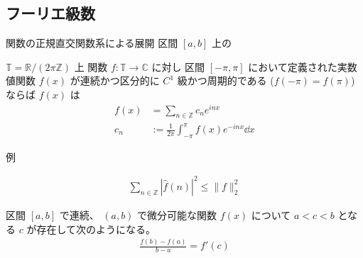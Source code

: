 \documentclass[uplatex,dvipdfmx,a4paper,11pt]{jlreq}
\newcommand{\CC}{\mathbb{C}}
\newcommand{\RR}{\mathbb{R}}
\newcommand{\ZZ}{\mathbb{Z}}
\newcommand{\TT}{\mathbb{T}}
\theoremstyle{definition}
\begin{document}
\subsection{フーリエ級数}
\begin{definition}[内積]
  関数の正規直交関数系による展開
  区間 $[a, b]$ 上の
\end{definition}


\begin{definition}[複素フーリエ級数]
  $\TT = \RR/(2\pi\ZZ)$ 上 関数 $f: \TT\to\CC$ に対し
  区間 $[-\pi, \pi]$ において定義された実数値関数 $f(x)$ が連続かつ区分的に $C^1$ 級かつ周期的である ($f(-\pi) = f(\pi)$) ならば $f(x)$ は
  \begin{align}
    f(x) & = \sum_{n\in\ZZ}c_ne^{inx}                          \\
    c_n  & := \frac{1}{2\pi}\int_{-\pi}^\pi f(x)e^{-inx}\dd{x}
  \end{align}
\end{definition}
例
\begin{theorem}
  \begin{align}
    \sum_{n\in\ZZ}|\hat{f}(n)|^2 \leq \|f\|_2^2
  \end{align}
\end{theorem}


\begin{theorem}[平均値の定理]
  区間 $[a, b]$ で連続、 $(a, b)$ で微分可能な関数 $f(x)$ について $a < c < b$ となる $c$ が存在して次のようになる。
  \begin{align}
    \frac{f(b) - f(a)}{b - a} = f'(c)
  \end{align}
\end{theorem}
\end{document}
